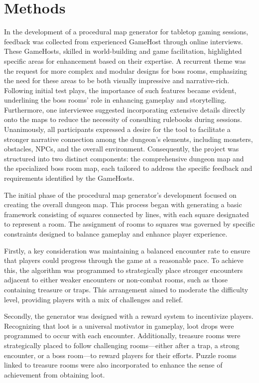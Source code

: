 \documentclass[10pt,twocolumn]{article}
\begin{document}
\section{Methods}
In the development of a procedural map generator for tabletop gaming sessions, feedback was collected from experienced GameHost through online interviews. These GameHosts, skilled in world-building and game facilitation, highlighted specific areas for enhancement based on their expertise. A recurrent theme was the request for more complex and modular designs for boss rooms, emphasizing the need for these areas to be both visually impressive and narrative-rich. Following initial test plays, the importance of such features became evident, underlining the boss rooms' role in enhancing gameplay and storytelling. Furthermore, one interviewee suggested incorporating extensive details directly onto the maps to reduce the necessity of consulting rulebooks during sessions. Unanimously, all participants expressed a desire for the tool to facilitate a stronger narrative connection among the dungeon's elements, including monsters, obstacles, NPCs, and the overall environment. Consequently, the project was structured into two distinct components: the comprehensive dungeon map and the specialized boss room map, each tailored to address the specific feedback and requirements identified by the GameHosts.

The initial phase of the procedural map generator's development focused on creating the overall dungeon map. This process began with generating a basic framework consisting of squares connected by lines, with each square designated to represent a room. The assignment of rooms to squares was governed by specific constraints designed to balance gameplay and enhance player experience.

Firstly, a key consideration was maintaining a balanced encounter rate to ensure that players could progress through the game at a reasonable pace. To achieve this, the algorithm was programmed to strategically place stronger encounters adjacent to either weaker encounters or non-combat rooms, such as those containing treasure or traps. This arrangement aimed to moderate the difficulty level, providing players with a mix of challenges and relief.

Secondly, the generator was designed with a reward system to incentivize players. Recognizing that loot is a universal motivator in gameplay, loot drops were programmed to occur with each encounter. Additionally, treasure rooms were strategically placed to follow challenging rooms—either after a trap, a strong encounter, or a boss room—to reward players for their efforts. Puzzle rooms linked to treasure rooms were also incorporated to enhance the sense of achievement from obtaining loot.
\end{document}

